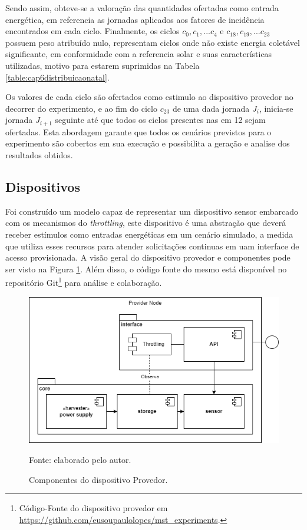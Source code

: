 Sendo assim, obteve-se a valoração das quantidades ofertadas como entrada energética, em referencia as jornadas aplicados aos fatores de incidência encontrados em cada ciclo. Finalmente, os ciclos $c_0, c_1,... c_4$ e $c_{18}, c_{19},... c_{23}$ possuem peso atribuído nulo, representam ciclos onde não existe energia coletável significante, em conformidade com a referencia solar e suas características utilizadas, motivo para estarem suprimidas na Tabela \ref{table:cap6distribuicaonatal}.

Os valores de cada ciclo são ofertados como estimulo ao dispositivo provedor no decorrer do experimento, e ao fim do ciclo $c_{23}$ de uma dada jornada $J_i$, inicia-se jornada $J_{i+1}$ seguinte até que todos os ciclos presentes nas em 12 sejam ofertadas. Esta abordagem garante que todos os cenários previstos para o experimento são cobertos em sua execução e possibilita a geração e analise dos resultados obtidos.

\subsection{Dispositivos}

Foi construído um modelo capaz de representar um dispositivo sensor embarcado com os mecanismos do \textit{throttling}, este dispositivo é uma abstração que deverá receber estímulos como entradas energéticas em um cenário simulado, a medida que utiliza esses recursos para atender solicitações continuas em uam interface de acesso provisionada. A visão geral do dispositivo provedor e componentes pode ser visto na Figura \ref{fig:cap6providernode}. Além disso, o código fonte do mesmo está disponível no repositório Git\footnote{Código-Fonte do dispositivo provedor em \url{https://github.com/eusoupaulolopes/mst_experiments}.}  para análise e colaboração.

\begin{figure}[H]
	\centering
	
	\caption{Componentes do dispositivo Provedor.}
	\label{fig:cap6providernode}
	\noindent\includegraphics[width=0.75\linewidth]{Imagens/cap6/cap6providernode.png} 
	
	Fonte: elaborado pelo autor.
\end{figure}


